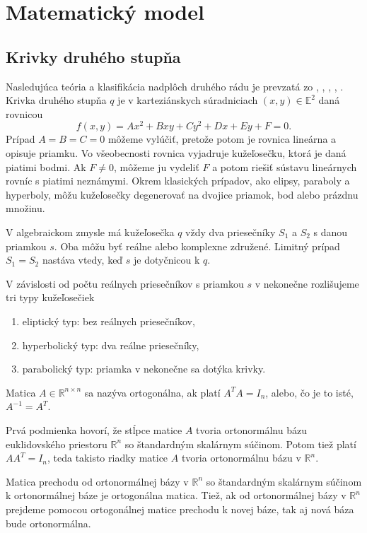 \chapter{Matematický model}
\label{kap:matematicky_model}
\section{Krivky druhého stupňa}
Nasledujúca teória a klasifikácia nadplôch druhého rádu je prevzatá zo \cite{Ivan}, \cite{Kor13}, \cite{Gla16}, \cite{Ode20}, \cite{Zla11}.
Krivka druhého stupňa $q$ je v karteziánskych súradniciach $(x, y) \in \mathbb{E}^2$ daná rovnicou 
$$ f(x, y) = Ax^2 + Bxy + Cy^2 + Dx + Ey + F = 0.$$
Prípad $A = B = C = 0$  môžeme vylúčiť, pretože potom je rovnica lineárna a opisuje priamku. Vo všeobecnosti rovnica vyjadruje kužeľosečku, ktorá je daná piatimi bodmi. Ak $F \neq 0$, môžeme ju vydeliť $F$ a potom riešiť sústavu lineárnych rovníc s piatimi neznámymi. Okrem klasických prípadov, ako elipsy, paraboly a hyperboly, môžu kužeľosečky degenerovať na dvojice priamok, bod alebo prázdnu množinu.

V algebraickom zmysle má kužeľosečka $q$ vždy dva priesečníky $S_1$ a $S_2$ s danou priamkou $s$. Oba môžu byť reálne alebo komplexne združené. Limitný prípad $S_1 = S_2$ nastáva vtedy, keď $s$ je dotyčnicou k $q$.

V závislosti od počtu reálnych priesečníkov s priamkou $s$ v nekonečne rozlišujeme tri typy kužeľosečiek 
\begin{enumerate}
\item eliptický typ: bez reálnych priesečníkov,
\item hyperbolický typ: dva reálne priesečníky,
\item parabolický typ: priamka v nekonečne sa dotýka krivky.
\end{enumerate}

\begin{definition}
Matica $A \in \mathbb{R}^{n \times n}$ sa nazýva ortogonálna, ak platí $A^T A = I_n$, alebo, čo je to isté, $A^{-1} = A^T$. 
\end{definition}
Prvá podmienka hovorí, že stĺpce matice $A$ tvoria ortonormálnu bázu euklidovského priestoru $\mathbb{R}^n$ so štandardným skalárnym súčinom. Potom tiež platí $A A^T = I_n$, teda takisto riadky matice $A$ tvoria ortonormálnu bázu v $\mathbb{R}^n$. 

\begin{theorem} 
Matica prechodu od ortonormálnej bázy v $\mathbb{R}^n$ so štandardným skalárnym súčinom k ortonormálnej báze je ortogonálna matica. Tiež, ak od ortonormálnej bázy v $\mathbb{R}^n$ prejdeme pomocou ortogonálnej matice prechodu k novej báze,
tak aj nová báza bude ortonormálna.
\end{theorem}

